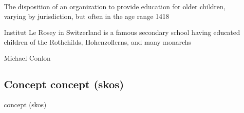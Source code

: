 \documentclass[letterpaper,10pt,english]{sphinxmanual}
\begin{document}
\begin{sphinxShadowBox}

\sphinxAtStartPar
{\hyperref[\detokenize{doc-BFO_0000016::doc}]{}}
\end{sphinxShadowBox}

\begin{sphinxShadowBox}

\sphinxAtStartPar
The disposition of an organization to provide education for older children, varying by jurisdiction, but often in the age range 14\sphinxhyphen{}18
\end{sphinxShadowBox}

\begin{sphinxShadowBox}

\sphinxAtStartPar
{}
\end{sphinxShadowBox}

\begin{sphinxShadowBox}

\sphinxAtStartPar
Institut Le Rosey in Switzerland is a famous secondary school having educated children of the Rothchilds, Hohenzollerns, and many monarchs
\end{sphinxShadowBox}

\begin{sphinxShadowBox}

\sphinxAtStartPar
Michael Conlon 
\end{sphinxShadowBox}
\begin{quote}

\ignorespaces \end{quote}


\subsection{Concept \sphinxhyphen{} concept (skos)}
\label{\detokenize{doc-Concept:concept-concept-skos}}\label{\detokenize{doc-Concept:index-0}}\label{\detokenize{doc-Concept::doc}}
\begin{sphinxShadowBox}

\sphinxAtStartPar
concept (skos)
\end{sphinxShadowBox}
\end{document}
